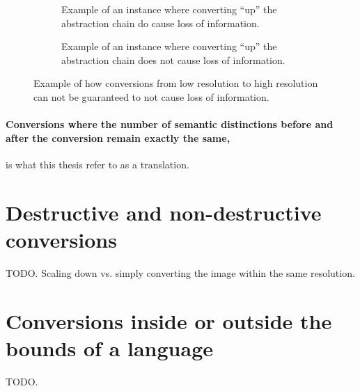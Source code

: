 \documentclass{scrreprt}
\begin{document}
\begin{figure}[h]

\begin{subfigure}{.5\textwidth}
  \centering

  \caption{Example of an instance where converting ``up'' the abstraction chain do cause loss of information.}
  \label{fig:low-to-high-resolution-destructive}
\end{subfigure}%
\begin{subfigure}{.5\textwidth}
  \centering

  \caption{Example of an instance where converting ``up'' the abstraction chain does not cause loss of information.}
  \label{fig:low-to-high-resolution-non-destructive}
\end{subfigure}

\caption{Example of how conversions from low resolution to high resolution can not be guaranteed to not cause loss of information.}
\end{figure}


\paragraph{Conversions where the number of semantic distinctions before and after the conversion remain exactly the same,} is what this thesis refer to as a translation. 



\color{red}
\section{Destructive and non-destructive conversions}
TODO. Scaling down vs. simply converting the image within the same resolution.

\section{Conversions inside or outside the bounds of a language}
\label{sec:conversions-in-or-out-of-languages}
TODO. 
\color{black}
\end{document}

